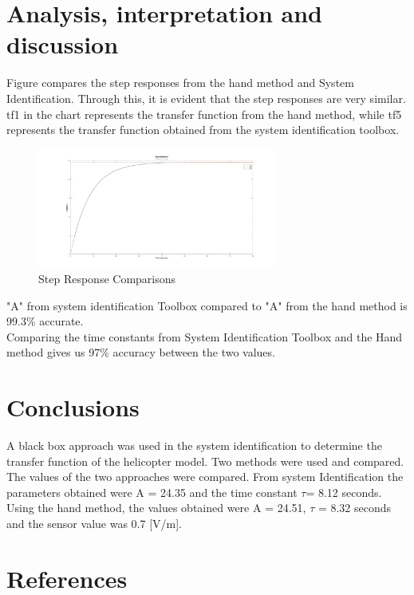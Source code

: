 \documentclass[12pt]{article}
\begin{document}



\section{\Large{Analysis, interpretation and discussion}}
Figure compares the step responses from the hand method and System Identification. Through this, it is evident that the step responses are very similar. tf1 in the chart represents the transfer function from the hand method, while tf5 represents the transfer function obtained from the system identification toolbox.
\begin{figure}[H]
     \centering
     \includegraphics[width=0.7\textwidth]{step response comparison.png}
     \caption{Step Response Comparisons}
     \label{fig:sample}
 \end{figure}

"A" from system identification Toolbox compared to "A" from the hand method is 99.3\% accurate.\\

Comparing the time constants from System Identification Toolbox and the Hand method gives us 97\% accuracy between the two values.

\newpage


\section{\Large{Conclusions}}

A black box approach was used in the system identification to determine the transfer function of the helicopter model. Two methods were used and compared. The values of the two approaches were compared. From system Identification the parameters obtained were A = 24.35 and the time constant \( \tau \)= 8.12 seconds. Using the hand method, the values obtained were A = 24.51, \( \tau \) = 8.32 seconds and the sensor value was 0.7 [V/m].
\newpage


\section{\Large{References}}
\nocite{*}
\printbibliography

\end{document}
